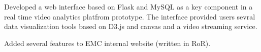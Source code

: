 \begin{cventry}
  \item Developed a web interface based on Flask and MySQL as a key component in a real time video analytics platfrom prototype.
  The interface provided users sevral data visualization tools based on D3.js and canvas and a video streaming service.
  \item Added several features to EMC internal website (written in RoR).
\end{cventry}
